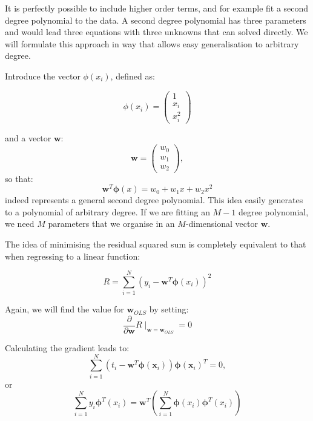   
   It is perfectly possible to include higher order terms, and for example fit a second
   degree polynomial to the data. A second degree polynomial has three parameters
   and would lead three equations with three unknowns that can solved directly. We
   will formulate this approach in way that allows easy generalisation to arbitrary
   degree.

   Introduce the vector $\phi(x_i)$, defined as:

   \begin{equation}
     \phi(x_i) = \left( \begin{array}{c} 1 \\ x_i \\ x^2_i \end{array} \right)
   \end{equation}

   and a vector $\boldsymbol{w}$:
   \begin{equation}
     \boldsymbol{w} = \left( \begin{array}{c} w_0 \\ w_1 \\ w_2 \end{array} \right),
   \end{equation}
   so that:
   $$
   \boldsymbol{w}^T \boldsymbol{\phi}(x)= w_0 + w_1x + w_2x^2
   $$
   indeed represents a general second degree polynomial. This idea
   easily generates to a polynomial of arbitrary degree. If we are fitting
   an $M-1$ degree polynomial, we need $M$ parameters that we organise in an
   $M$-dimensional vector $\boldsymbol{w}$.

   The idea of minimising the residual squared sum is completely equivalent to
   that when regressing to a linear function:

   \begin{equation}
     R = \sum^N_{i=1} (y_i - \boldsymbol{w}^T \boldsymbol{\phi}(x_i))^2
     \label{eq-residuesq}
   \end{equation}

   Again, we will find the value for $\boldsymbol{w}_{OLS}$ by setting:
   $$
   \frac{\partial }{\partial \boldsymbol{w}} R \mid_{\boldsymbol{w} = \boldsymbol{w}_{OLS}} = 0
   $$

   Calculating the gradient leads to:
   $$
   \sum^N_{i=1} (t_i - \boldsymbol{w}^T \boldsymbol{\phi}( \boldsymbol{x}_i))
   \boldsymbol{\phi}(\boldsymbol{x}_i)^T = 0,
   $$
   or
   \begin{equation}
     \sum^N_{i=1} y_i \boldsymbol{\phi}^T(x_i)  = \boldsymbol{w}^T(\sum^N_{i=1} \boldsymbol{\phi}(x_i) \boldsymbol{\phi}^T(x_i))
     \label{eq-solodl}
   \end{equation}

